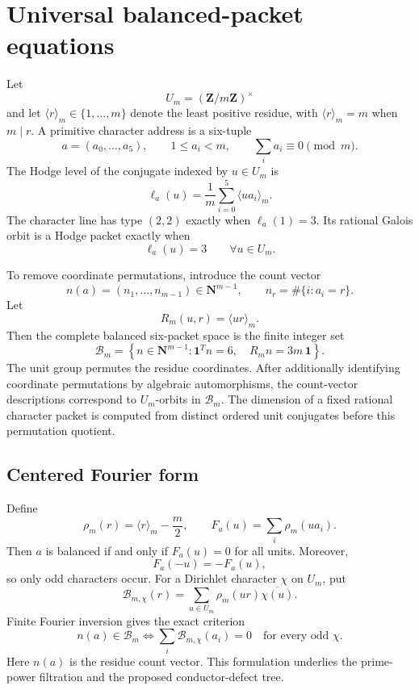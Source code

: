 \chapter{Universal balanced-packet equations}
Let
\[
U_m=(\mathbf Z/m\mathbf Z)^\times
\]
and let \(\langle r\rangle_m\in\{1,\ldots,m\}\) denote the least positive residue, with \(\langle r\rangle_m=m\) when \(m\mid r\). A primitive character address is a six-tuple
\[
a=(a_0,\ldots,a_5),\qquad 1\le a_i<m,
\qquad \sum_i a_i\equiv0\pmod m.
\]
The Hodge level of the conjugate indexed by \(u\in U_m\) is
\[
\ell_a(u)=\frac1m\sum_{i=0}^5\langle ua_i\rangle_m.
\]
The character line has type \((2,2)\) exactly when \(\ell_a(1)=3\). Its rational Galois orbit is a Hodge packet exactly when
\begin{equation}\label{eq:legacy-7.1}
\boxed{
\ell_a(u)=3\qquad\forall u\in U_m.
}\end{equation}

To remove coordinate permutations, introduce the count vector
\[
n(a)=(n_1,\ldots,n_{m-1})\in\mathbf N^{m-1},
\qquad n_r=\#\{i:a_i=r\}.
\]
Let
\[
R_m(u,r)=\langle ur\rangle_m.
\]
Then the complete balanced six-packet space is the finite integer set
\begin{equation}\label{eq:legacy-7.2}
\boxed{
\mathcal B_m=
\left\{
 n\in\mathbf N^{m-1}:
 \mathbf1^Tn=6,
 \quad R_mn=3m\,\mathbf1
\right\}.
}\end{equation}
The unit group permutes the residue coordinates. After additionally identifying coordinate permutations by algebraic automorphisms, the count-vector descriptions correspond to \(U_m\)-orbits in \(\mathcal B_m\). The dimension of a fixed rational character packet is computed from distinct ordered unit conjugates before this permutation quotient.



\section{Centered Fourier form}
Define
\[
\rho_m(r)=\langle r\rangle_m-\frac m2,
\qquad
F_a(u)=\sum_i\rho_m(ua_i).
\]
Then \(a\) is balanced if and only if \(F_a(u)=0\) for all units. Moreover,
\[
F_a(-u)=-F_a(u),
\]
so only odd characters occur. For a Dirichlet character \(\chi\) on \(U_m\), put
\[
\mathcal B_{m,\chi}(r)=
\sum_{u\in U_m}\rho_m(ur)\overline{\chi(u)}.
\]
Finite Fourier inversion gives the exact criterion
\begin{equation}\label{eq:legacy-7.3}
\boxed{
 n(a)\in\mathcal B_m
 \Longleftrightarrow
 \sum_i\mathcal B_{m,\chi}(a_i)=0
 \quad\text{for every odd }\chi.
}\end{equation}
Here $n(a)$ is the residue count vector. This formulation underlies the prime-power filtration and the proposed conductor-defect tree.

